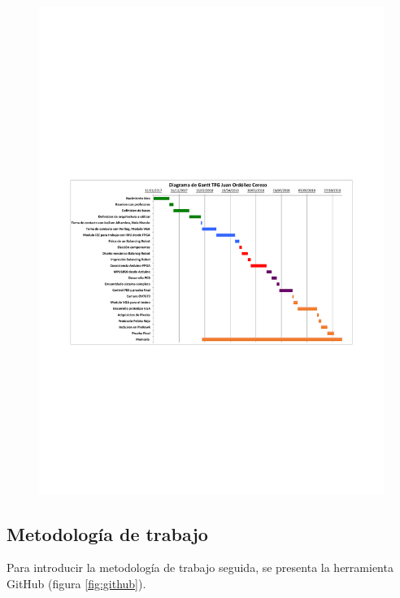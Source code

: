 \begin{center}
	\begin{figure}[H]
		\center
		\includegraphics[trim = 15mm 85mm 0mm 100mm,clip, angle=-90, scale = 1.4]{imagenes/Introduction/Gantt.pdf}
		\label{fig:diagramaGantt}
	\end{figure}
\end{center}

\subsection{Metodología de trabajo}
Para introducir la metodología de trabajo seguida, se presenta la herramienta GitHub (figura \ref{fig:github}).\newline 

